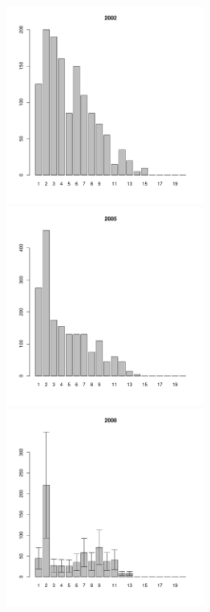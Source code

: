 \documentclass[12pt, a4paper]{article}
\begin{document}
\begin{figure}[h]
\begin{multicols}{3}
\hfill
\includegraphics[width=65mm]{../White_Sea/Luvenga_Goreliy/high_2002_.pdf}
\hfill
\includegraphics[width=65mm]{../White_Sea/Luvenga_Goreliy/high_2005_.pdf}
\hfill
\includegraphics[width=65mm]{../White_Sea/Luvenga_Goreliy/high_2008_.pdf}
\end{multicols}




\end{figure}
\end{document}
